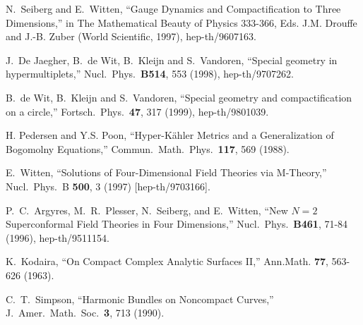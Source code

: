 \documentclass[a4paper,12pt, amsfonts, amssymb]{article}
\begin{document}
\begin{thebibliography}{99}
 N.~Seiberg and E.~Witten, ``Gauge Dynamics and
Compactification to Three Dimensions,'' in The Mathematical Beauty
of Physics 333-366, Eds. J.M. Drouffe and J.-B. Zuber (World
Scientific, 1997), hep-th/9607163.

J.~De Jaegher, B.~de Wit, B.~Kleijn and S.~Vandoren, ``Special
geometry in hypermultiplets,'' Nucl.\ Phys.\  {\bf B514}, 553
(1998), hep-th/9707262.

B.~de Wit, B.~Kleijn and S.~Vandoren, ``Special geometry and
compactification on a circle,'' Fortsch.\ Phys.\  {\bf 47}, 317
(1999), hep-th/9801039.

H. Pedersen and Y.S. Poon, ``Hyper-K\"ahler Metrics and a Generalization
of Bogomolny Equations,'' Commun.\ Math.\ Phys.\ {\bf 117}, 569 (1988).

 E.~Witten,
``Solutions of Four-Dimensional Field Theories via M-Theory,''
Nucl.\ Phys.\ B {\bf 500}, 3 (1997) [hep-th/9703166].

 P.~C.~Argyres, M.~R.~Plesser, N.~Seiberg, and E.~Witten,
``New $N=2$ Superconformal Field Theories in Four Dimensions,''
Nucl.\ Phys.\ {\bf B461}, 71-84 (1996), hep-th/9511154.


K.~Kodaira, ``On Compact Complex Analytic Surfaces II,'' Ann.Math. {\bf 77}, 563-626 (1963).

 C.~T.~Simpson, ``Harmonic Bundles on Noncompact
Curves,'' J.\ Amer.\ Math.\ Soc.\ {\bf 3}, 713 (1990).

\end{thebibliography}
\end{document}
